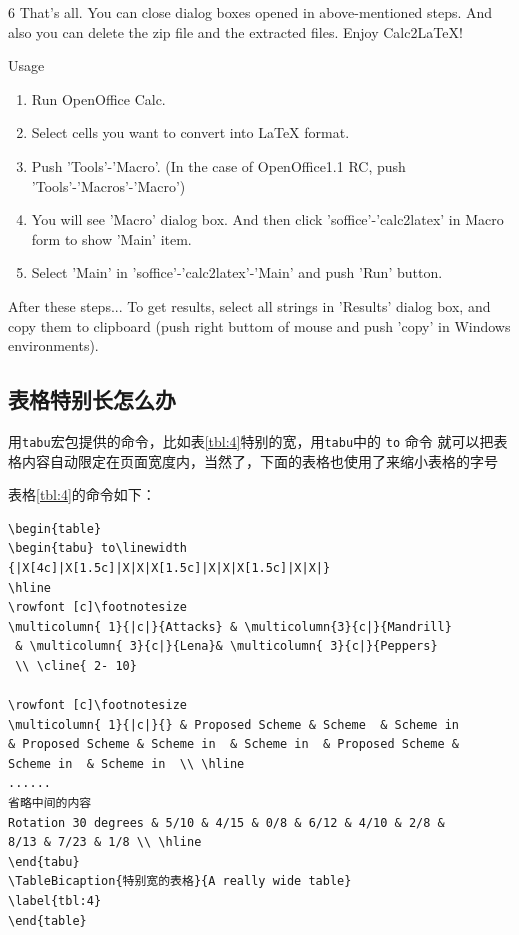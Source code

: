 6 That's all. You can close dialog boxes opened in above-mentioned steps. And also you can delete the zip file and the extracted files.
Enjoy Calc2LaTeX!

Usage

\begin{enumerate}
\item Run OpenOffice Calc.
\item Select cells you want to convert into LaTeX format.
\item Push 'Tools'-'Macro'. (In the case of OpenOffice1.1 RC, push 'Tools'-'Macros'-'Macro')
\item You will see 'Macro' dialog box. And then click 'soffice'-'calc2latex' in Macro form to show 'Main' item.
\item Select 'Main' in 'soffice'-'calc2latex'-'Main' and push 'Run' button.
\end{enumerate}

After these steps...
To get results, select all strings in 'Results' dialog box, and copy them to clipboard (push right buttom of mouse and push 'copy' in Windows environments).

\subsection{表格特别长怎么办}

用\texttt{tabu}宏包提供的命令，比如表\ref{tbl:4}特别的宽，用\texttt{tabu}中的 \texttt{to\linewidth} 命令
就可以把表格内容自动限定在页面宽度内，当然了，下面的表格也使用了\texttt{\footnotesize}来缩小表格的字号

表格\ref{tbl:4}的命令如下：
\begin{verbatim}
\begin{table}
\begin{tabu} to\linewidth {|X[4c]|X[1.5c]|X|X|X[1.5c]|X|X|X[1.5c]|X|X|}
\hline
\rowfont [c]\footnotesize
\multicolumn{ 1}{|c|}{Attacks} & \multicolumn{3}{c|}{Mandrill}
 & \multicolumn{ 3}{c|}{Lena}& \multicolumn{ 3}{c|}{Peppers} 
 \\ \cline{ 2- 10}
 
\rowfont [c]\footnotesize
\multicolumn{ 1}{|c|}{} & Proposed Scheme & Scheme  & Scheme in  
& Proposed Scheme & Scheme in  & Scheme in  & Proposed Scheme & 
Scheme in  & Scheme in  \\ \hline
...... 
省略中间的内容
Rotation 30 degrees & 5/10 & 4/15 & 0/8 & 6/12 & 4/10 & 2/8 & 
8/13 & 7/23 & 1/8 \\ \hline
\end{tabu}
\TableBicaption{特别宽的表格}{A really wide table}
\label{tbl:4}
\end{table}
\end{verbatim}



